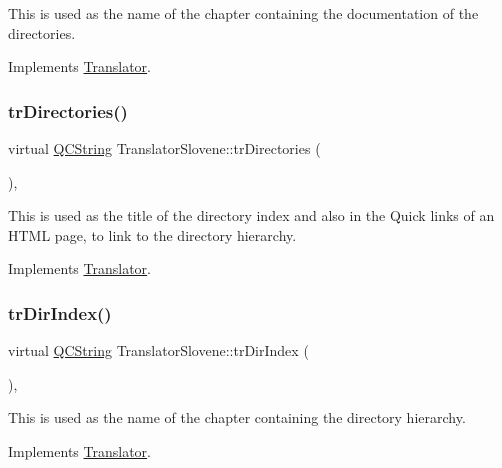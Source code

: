 This is used as the name of the chapter containing the documentation of the directories. 

Implements \mbox{\hyperlink{class_translator}{Translator}}.

\mbox{\label{class_translator_slovene_a7d975ec6d1c31123233ffbe5d6c7d846}} 
\subsubsection{\texorpdfstring{trDirectories()}{trDirectories()}}
{\footnotesize\ttfamily virtual \mbox{\hyperlink{class_q_c_string}{Q\+C\+String}} Translator\+Slovene\+::tr\+Directories (\begin{DoxyParamCaption}{ }\end{DoxyParamCaption})\hspace{0.3cm}{\ttfamily [inline]}, {\ttfamily [virtual]}}

This is used as the title of the directory index and also in the Quick links of an H\+T\+ML page, to link to the directory hierarchy. 

Implements \mbox{\hyperlink{class_translator}{Translator}}.

\mbox{\label{class_translator_slovene_a918bd99647fd753504f052d39b004e79}} 
\subsubsection{\texorpdfstring{trDirIndex()}{trDirIndex()}}
{\footnotesize\ttfamily virtual \mbox{\hyperlink{class_q_c_string}{Q\+C\+String}} Translator\+Slovene\+::tr\+Dir\+Index (\begin{DoxyParamCaption}{ }\end{DoxyParamCaption})\hspace{0.3cm}{\ttfamily [inline]}, {\ttfamily [virtual]}}

This is used as the name of the chapter containing the directory hierarchy. 

Implements \mbox{\hyperlink{class_translator}{Translator}}.

\mbox{\label{class_translator_slovene_ad4fb72cba367a1abc0526ef9a6b057f6}} 
